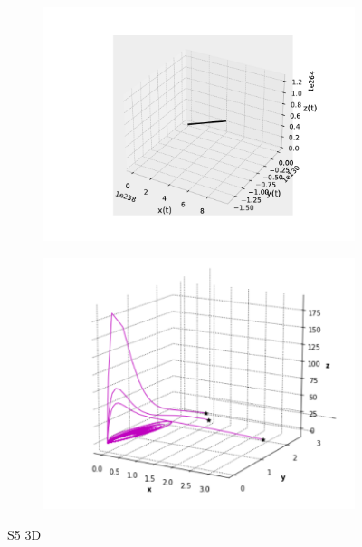 \documentclass{wscpaperproc}
\theoremstyle{wsc}
\begin{document}
\begin{figure}[h]
	\centering
	\begin{subfigure}[b]{0.5\textwidth}
		\centering
		\includegraphics[width=\textwidth]{Simulations/S53d.pdf}
	
		\label{fig:comparativa121}
	\end{subfigure}%
	\begin{subfigure}[b]{0.5\textwidth}
		\centering
		\includegraphics[width=\textwidth]{GraficasPaper/Mistery3D2.png}
		\label{fig:comparativa122}
	\end{subfigure}
	\caption{S5 3D}

	\label{fig:comparacion16}
\end{figure}
\end{document}
